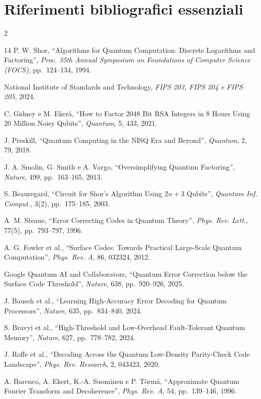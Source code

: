 \par
\vspace{-4pt}
\section{Riferimenti bibliografici essenziali}
\begingroup
{}
\fontsize{6.4}{7.0}\selectfont
\setlength{\columnsep}{10pt}
\begin{multicols}{2}
\raggedcolumns
\raggedright %
\renewcommand{\section}[1]{}%
\begin{thebibliography}{14}
\setlength{\itemsep}{-1pt}
\setlength{\parsep}{0pt}
 P. W. Shor, ``Algorithms for Quantum Computation: Discrete Logarithms and
Factoring'', \emph{Proc. 35th Annual Symposium on Foundations of Computer Science (FOCS)},
pp.~124--134, 1994.

 National Institute of Standards and Technology,
\emph{FIPS 203, FIPS 204 e FIPS 205}, 2024.

 C. Gidney e M. Eker\aa, ``How to Factor 2048 Bit RSA Integers in
8 Hours Using 20 Million Noisy Qubits'', \emph{Quantum}, 5, 433, 2021.

 J. Preskill, ``Quantum Computing in the NISQ Era and Beyond'', \emph{Quantum},
2, 79, 2018.

 J. A. Smolin, G. Smith e A. Vargo, ``Oversimplifying Quantum
Factoring'', \emph{Nature}, 499, pp.~163--165, 2013.

 S. Beauregard, ``Circuit for Shor's Algorithm Using \(2n+3\) Qubits'',
\emph{Quantum Inf. Comput.}, 3(2), pp.~175--185, 2003.

 A. M. Steane, ``Error Correcting Codes in Quantum Theory'',
\emph{Phys. Rev. Lett.}, 77(5), pp.~793--797, 1996.

 A. G. Fowler et al., ``Surface Codes: Towards Practical Large-Scale
Quantum Computation'', \emph{Phys. Rev. A}, 86, 032324, 2012.

 Google Quantum AI and Collaborators, ``Quantum
Error Correction below the Surface Code Threshold'', \emph{Nature}, 638,
pp.~920--926, 2025.

 J. Bausch et al., ``Learning High-Accuracy Error Decoding for
Quantum Processors'', \emph{Nature}, 635, pp.~834--840, 2024.

 S. Bravyi et al., ``High-Threshold and Low-Overhead Fault-Tolerant
Quantum Memory'', \emph{Nature}, 627, pp.~778--782, 2024.

 J. Roffe et al., ``Decoding Across the Quantum Low-Density Parity-Check Code
Landscape'', \emph{Phys. Rev. Research}, 2, 043423, 2020.

 A. Barenco, A. Ekert, K.-A. Suominen e P. Törmä,
``Approximate Quantum Fourier Transform and Decoherence'', \emph{Phys. Rev. A},
54, pp.~139--146, 1996.
\end{thebibliography}
\end{multicols}
\endgroup
